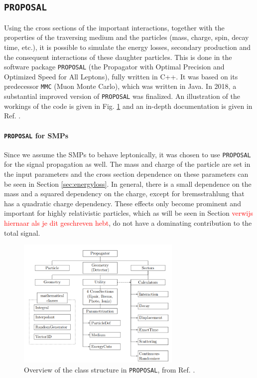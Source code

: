 \subsection{\texttt{PROPOSAL}}
Using the cross sections of the important interactions, together with the properties of the traversing medium and the particles (mass, charge, spin, decay time, etc.), it is possible to simulate the energy losses, secondary production and the consequent interactions of these daughter particles. This is done in the software package \texttt{PROPOSAL}  (the Propagator with Optimal Precision and Optimized Speed for All Leptons), fully written in C++. It was based on its predecessor \texttt{MMC} (Muon Monte Carlo), which was written in Java. In 2018, a substantial improved version of \texttt{PROPOSAL} was finalized. An illustration of the workings of the code is given in Fig. \ref{fig:proposal} and an in-depth documentation is given in Ref. \cite{Dunsch:2018nsc}.

\paragraph{\texttt{PROPOSAL} for SMPs}
Since we assume the SMPs to behave leptonically, it was chosen to use \texttt{PROPOSAL} for the signal propagation as well. The mass and charge of the particle are set in the input parameters and the cross section dependence on these parameters can be seen in Section \ref{sec:energyloss}. In general, there is a small dependence on the mass and a squared dependency on the charge, except for bremsstrahlung that has a quadratic charge dependency. These effects only become prominent and important for highly relativistic particles, which as will be seen in Section \textcolor{red}{verwijs hiernaar als je dit geschreven hebt}, do not have a dominating contribution to the total signal.\\

\begin{figure}
\centering
\includegraphics[width=0.7\textwidth]{chapter6/img/proposal.png}
\caption{Overview of the class structure in \texttt{PROPOSAL}, from Ref. \cite{Dunsch:2018nsc}.}
\label{fig:proposal}
\end{figure}

